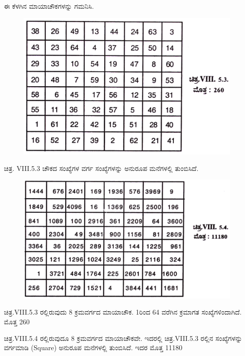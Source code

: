 ಈ ಕೆಳಗಿನ ಮಾಯಾಚೌಕಗಳನ್ನು ಗಮನಿಸಿ.
\begin{figure}[H]
\includegraphics{src/figures/chap7/fig7.17.jpg}
\end{figure}

ಚಿತ್ರ. VIII.5.3 ಚೌಕದ ಸಂಖ್ಯೆಗಳ ವರ್ಗ ಸಂಖ್ಯೆಗಳನ್ನು ಅನುರೂಪ ಮನೆಗಳಲ್ಲಿ ತುಂಬಿಸಿದೆ.
\begin{figure}[H]
\includegraphics{src/figures/chap7/fig7.18.jpg}
\end{figure}

ಚಿತ್ರ.VIII.5.3 ರಲ್ಲಿರುವುದು 8 ಕ್ರಮವರ್ಗದ ಮಾಯಾಚೌಕ. 1ರಿಂದ 64 ವರೆಗಿನ ಕ್ರಮಾಗತ ಸಂಖ್ಯೆಗಳಿಂದಾಗಿದೆ. ಮೊತ್ತ 260

ಚಿತ್ರ.VIII.5.4 ರಲ್ಲಿರುವುದೂ 8 ಕ್ರಮವರ್ಗದ ಮಾಯಾಚೌಕವೇ. ಇದರಲ್ಲಿ ಚಿತ್ರ.VIII.5.3 ರಲ್ಲಿನ ಸಂಖ್ಯೆಗಳನ್ನು ವರ್ಗಮಾಡಿ (Square) ಅನುರೂಪ ಮನೆಗಳಲ್ಲಿ ತುಂಬಿಸಿದೆ. ಇದರ ಮೊತ್ತ 11180

